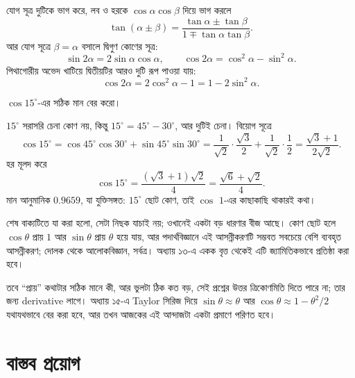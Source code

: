 \documentclass[11pt]{article}
\begin{document}
\begin{idea}[tangent ও দ্বিগুণ কোণ]
যোগ সূত্র দুটিকে ভাগ করে, লব ও হরকে $\cos\alpha\cos\beta$ দিয়ে ভাগ করলে
\[
  \tan(\alpha \pm \beta) = \frac{\tan\alpha \pm \tan\beta}
                                {1 \mp \tan\alpha\tan\beta} .
\]
আর যোগ সূত্রে $\beta = \alpha$ বসালে দ্বিগুণ কোণের সূত্র:
\[
  \sin 2\alpha = 2\sin\alpha\cos\alpha, \qquad
  \cos 2\alpha = \cos^2\alpha - \sin^2\alpha .
\]
পিথাগোরীয় অভেদ খাটিয়ে দ্বিতীয়টির আরও দুটি রূপ পাওয়া যায়:
\[
  \cos 2\alpha = 2\cos^2\alpha - 1 = 1 - 2\sin^2\alpha .
\]
\end{idea}

\begin{example}
$\cos 15^\circ$-এর সঠিক মান বের করো।
\end{example}

\begin{solbox}
$15^\circ$ সরাসরি চেনা কোণ নয়, কিন্তু $15^\circ = 45^\circ - 30^\circ$, আর
দুটিই চেনা। বিয়োগ সূত্রে
\[
  \cos 15^\circ = \cos 45^\circ \cos 30^\circ + \sin 45^\circ \sin 30^\circ
  = \frac{1}{\sqrt{2}} \cdot \frac{\sqrt{3}}{2}
  + \frac{1}{\sqrt{2}} \cdot \frac{1}{2}
  = \frac{\sqrt{3} + 1}{2\sqrt{2}} .
\]
হর মূলদ করে
\[
  \cos 15^\circ = \frac{(\sqrt{3}+1)\sqrt{2}}{4} = \frac{\sqrt{6} + \sqrt{2}}{4} .
\]
মান আনুমানিক $0.9659$, যা যুক্তিসঙ্গত: $15^\circ$ ছোট কোণ, তাই $\cos$ $1$-এর
কাছাকাছি থাকারই কথা।
\end{solbox}

\begin{remark}
শেষ বাক্যটিতে যা করা হলো, সেটা নিছক যাচাই নয়; ওখানেই একটা বড় ধারণার বীজ আছে।
কোণ ছোট হলে $\cos\theta$ প্রায় $1$ আর $\sin\theta$ প্রায় $\theta$ হয়ে যায়,
আর পদার্থবিজ্ঞানে এই আসন্নীকরণটি সম্ভবত সবচেয়ে বেশি ব্যবহৃত আসন্নীকরণ; দোলক
থেকে আলোকবিজ্ঞান, সর্বত্র। অধ্যায় ১৩-এ একক বৃত্ত থেকেই এটি জ্যামিতিকভাবে
প্রতিষ্ঠা করা হবে।

তবে ``প্রায়'' কথাটার সঠিক মানে কী, আর ভুলটা ঠিক কত বড়, সেই প্রশ্নের উত্তর
ত্রিকোণমিতি দিতে পারে না; তার জন্য derivative লাগে। অধ্যায় ১৫-এ Taylor
সিরিজ দিয়ে $\sin\theta \approx \theta$ আর
$\cos\theta \approx 1 - \theta^2/2$ যথাযথভাবে বের করা হবে, আর তখন আজকের এই
আন্দাজটা একটা প্রমাণে পরিণত হবে।
\end{remark}

\section{বাস্তব প্রয়োগ}
\end{document}

